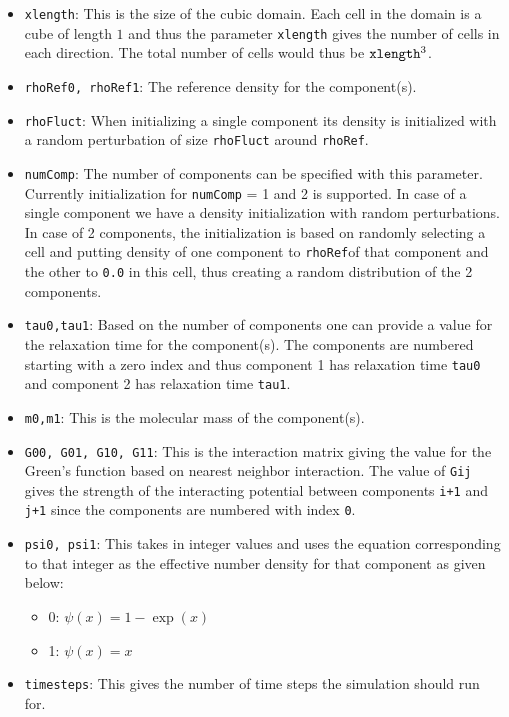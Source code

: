 \documentclass[11pt]{article}
\begin{document}
\begin{itemize}
	\item \verb|xlength|: This is the size of the cubic domain. Each cell in the domain is a cube of length $1$ and thus the parameter \verb|xlength| gives the number of cells in each direction. The total number of cells would thus be $\verb|xlength|^3$.
    \item \verb|rhoRef0, rhoRef1|:  The reference density for the component(s).
    \item \verb|rhoFluct|: When initializing a single component its density is initialized with a random perturbation of size \verb|rhoFluct| around \verb|rhoRef|.
    \item \verb|numComp|: The number of components can be specified with this parameter. Currently initialization for \verb|numComp| = 1 and 2 is supported. In case of a single component we have a density initialization with random perturbations. In case of 2 components, the initialization is based on randomly selecting a cell and putting density of one component to \verb|rhoRef|of that component and the other to \verb|0.0| in this cell, thus creating a random distribution of the 2 components.
	\item \verb|tau0,tau1|: Based on the number of components one can provide a value for the relaxation time for the component(s). The components are numbered starting with a zero index and thus component 1 has relaxation time \verb|tau0| and component 2 has relaxation time \verb|tau1|.
	\item \verb|m0,m1|: This is the molecular mass of the component(s).
	\item \verb|G00, G01, G10, G11|: This is the interaction matrix giving the value for the Green's function based on nearest neighbor interaction. The value of \verb|Gij| gives the strength of the interacting potential between components \verb|i+1| and \verb|j+1| since the components are numbered with index \verb|0|.
	\item \verb|psi0, psi1|: This takes in integer values and uses the equation corresponding to that integer as the effective number density for that component as given below:
	\begin{itemize}
		\item 0: $\psi(x) = 1-\exp(x)$
		\item 1: $\psi(x) = x$
	\end{itemize}
	\item \verb|timesteps|: This gives the number of time steps the simulation should run for.

\end{itemize}
\end{document}

